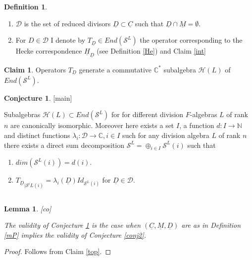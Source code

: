 \documentclass[11pt,a4paper,twoside]{amsart}
\newtheorem{lemma}[theorem]{Lemma}
\theoremstyle{definition}
\newtheorem{definition}[theorem]{Definition}
\newtheorem{claim}[theorem]{Claim}
\newtheorem{conjecture}[theorem]{Conjecture}
\newcommand{\mC}{\mathbb C}
\newcommand{\mN}{\mathbb N}
\newcommand{\mcD}{\mathcal D}
\newcommand{\mcH}{\mathcal H}
\newcommand{\mcS}{\mathcal S}
\newcommand{\bl}{\lambda}
\newcommand{\un}{\underline}
\newcommand{\emp}{\emptyset}
\begin{document}
\begin{definition} \begin{enumerate}
\item
$\mcD$ is the set of reduced divisors 
$\un D \subset \un C$ such that $\un D \cap \un M= \emp$.
\item For $D\in \mcD$ I denote by $T_{\un D}\in End (\mcS ^L) $ the operator corresponding to the Hecke correspondence $\un H _{\un D}$ (see Definition \ref{He}) and Claim \ref{int}

\end{enumerate}
\end{definition} 
\begin{claim} Operators $T_{\un D}$ generate a commutative $\mC ^\ast$ subalgebra $\mcH (L)$ of $ End (\mcS ^L) $.
\end{claim}

\begin{conjecture}\label{main}[main]
\item Subalgebras  $\mcH (L)\subset  End (\mcS ^L) $ for for different division $F$-algebras $L$ of rank $n$ are canonically isomorphic. Moreover 
here exists a set $I$, a function $d: I \to \mN$
and distinct functions $\bl _i:\mcD \to \mC ,i\in I$ 
such for any division algebra $L$ of rank $n$ there exists a direct sum decomposition $\mcS ^L = \oplus _{i\in I} \mcS ^L(i)$ such that  

\begin{enumerate}
\item $dim ( \mcS ^L (i)) = d(i)$.
\item ${T_ {\un D}}_{| \mcS ^i
L(i)}= \bl _i(\un D)Id _{  \mcS ^L (i)}$ for $ \un D \in \mcD$.
\end{enumerate}
\end{conjecture} 

\subsection{}

\begin{lemma}\label{co}[co]

The validity of Conjecture \ref{main} is the case when $(\un C,\un M, \un D)$ are as in Definition \ref{mP} implies the validity of Conjecture \ref{conj2}.
\end{lemma}
\begin{proof}Follows from Claim \ref{top}.
\end{proof}
\end{document}
